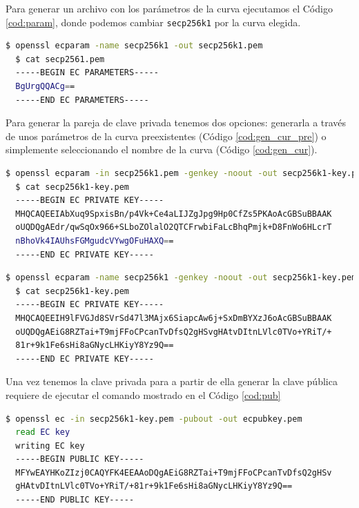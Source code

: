 \documentclass[11pt]{article}
\begin{document}
Para generar un archivo con los parámetros de la curva ejecutamos el Código \ref{cod:param}, donde podemos cambiar \texttt{secp256k1} por la curva elegida.

\begin{lstlisting}[language=bash, label={cod:EC}, caption={Generar los parámetros de la curva}, morekeywords={name, out}]
  $ openssl ecparam -name secp256k1 -out secp256k1.pem
  $ cat secp2561.pem
  -----BEGIN EC PARAMETERS-----
  BgUrgQQACg==
  -----END EC PARAMETERS-----
\end{lstlisting}

Para generar la pareja de clave privada tenemos dos opciones: generarla a través de unos parámetros de la curva preexistentes (Código \ref{cod:gen_cur_pre}) o simplemente seleccionando el nombre de la curva (Código \ref{cod:gen_cur}).

\begin{lstlisting}[language=bash, label={cod:gen_cur_pre}, caption={Crear clave privada, parámetros de curva preexistentes}, morekeywords={out, pubout, genkey}]
  $ openssl ecparam -in secp256k1.pem -genkey -noout -out secp256k1-key.pem
  $ cat secp256k1-key.pem 
  -----BEGIN EC PRIVATE KEY-----
  MHQCAQEEIAbXuq9SpxisBn/p4Vk+Ce4aLIJZgJpg9Hp0CfZs5PKAoAcGBSuBBAAK
  oUQDQgAEdr/qwSqOx966+SLboZOlalO2QTCFrwbiFaLcBhqPmjk+D8FnWo6HLcrT
  nBhoVk4IAUhsFGMgudcVYwgOFuHAXQ==
  -----END EC PRIVATE KEY-----
\end{lstlisting}

\begin{lstlisting}[language=bash, label={cod:gen_cur}, caption={Crear clave privada a partir del nombre de la curva}, morekeywords={out, genkey, noout, name}]
  $ openssl ecparam -name secp256k1 -genkey -noout -out secp256k1-key.pem
  $ cat secp256k1-key.pem
  -----BEGIN EC PRIVATE KEY-----
  MHQCAQEEIH9lFVGJd8SVrSd47l3MAjx6SiapcAw6j+SxDmBYXzJ6oAcGBSuBBAAK
  oUQDQgAEiG8RZTai+T9mjFFoCPcanTvDfsQ2gHSvgHAtvDItnLVlc0TVo+YRiT/+
  81r+9k1Fe6sHi8aGNycLHKiyY8Yz9Q==
  -----END EC PRIVATE KEY-----
\end{lstlisting}

Una vez tenemos la clave privada para a partir de ella generar la clave pública requiere de ejecutar el comando mostrado en el Código \ref{cod:pub}

\begin{lstlisting}[language=bash, label={cod:pub}, caption={Crear la clave pública a partir de la privada}, morekeywords={out, pubout}]
  $ openssl ec -in secp256k1-key.pem -pubout -out ecpubkey.pem
  read EC key
  writing EC key
  -----BEGIN PUBLIC KEY-----
  MFYwEAYHKoZIzj0CAQYFK4EEAAoDQgAEiG8RZTai+T9mjFFoCPcanTvDfsQ2gHSv
  gHAtvDItnLVlc0TVo+YRiT/+81r+9k1Fe6sHi8aGNycLHKiyY8Yz9Q==
  -----END PUBLIC KEY-----
\end{lstlisting}

\newpage
\nocite{*}
\printbibliography
\end{document}
